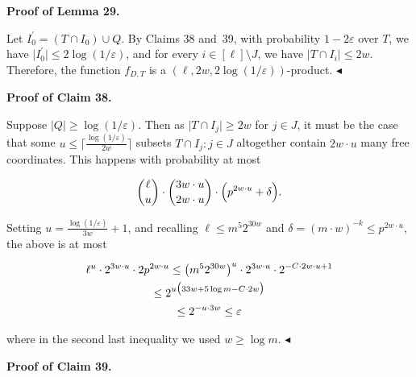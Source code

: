 \documentclass[10pt,a4paper]{article}
\begin{document}
\par\medskip\noindent\textbf{Proof of Lemma 29.}\par




Let $I_{0}^{\prime}=(T\cap I_{0})\cup Q$.
By Claims 38 and 39, with probability $1-2\varepsilon$ over $T$, we have $\lvert I_{0}^{\prime}\rvert\leq 2\log(1/\varepsilon)$, and for every $i\in[\ell]\setminus J$, we have $\lvert T\cap I_{i}\rvert\leq 2w$.
Therefore, the function $f_{D,T}$ is a $(\ell,2w,2\log(1/\varepsilon))$-product.
$\blacktriangleleft$\par





\par\medskip\noindent\textbf{Proof of Claim 38.}\par




Suppose $\lvert Q\rvert\geq\log(1/\varepsilon)$.
Then as $\lvert T\cap I_{j}\rvert\geq 2w$ for $j\in J$, it must be the case that some $u\leq\lceil\frac{\log(1/\varepsilon)}{2w}\rceil$ subsets $T\cap I_{j}:j\in J$ altogether contain $2w\cdot u$ many free coordinates.
This happens with probability at most\par


\[\begin{gathered}
\binom{\ell}{u}\cdot\binom{3w\cdot u}{2w\cdot u}\cdot\Bigl{(}p^{2w\cdot u}+\delta\Bigr{)}.
\end{gathered}\]


Setting $u=\frac{\log(1/\varepsilon)}{3w}+1$, and recalling $\ell\leq m^{5}2^{30w}$ and $\delta=(m\cdot w)^{-k}\leq p^{2w\cdot u}$, the above is at most\par


\[\begin{gathered}
\displaystyle\ell^{u}\cdot 2^{3w\cdot u}\cdot 2p^{2w\cdot u} \displaystyle\leq\bigl{(}m^{5}2^{30w}\bigr{)}^{u}\cdot 2^{3w\cdot u}\cdot 2^{-C\cdot 2w\cdot u+1} \\
\displaystyle\leq 2^{u\bigl{(}33w+5\log m-C\cdot 2w\bigr{)}} \\
\displaystyle\leq 2^{-u\cdot 3w}\leq\varepsilon
\end{gathered}\]


where in the second last inequality we used $w\geq\log m$.
$\blacktriangleleft$\par





\par\medskip\noindent\textbf{Proof of Claim 39.}\par
\end{document}
